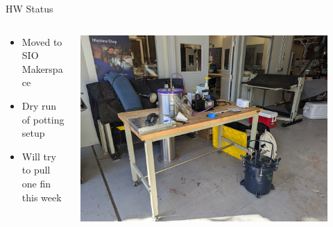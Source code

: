 \begin{frame}{HW Status}
    \begin{columns}
        \begin{column}{0.5\textwidth}
            \begin{itemize}
                \item Moved to SIO Makerspace
                \item Dry run of potting setup
                \item Will try to pull one fin this week
            \end{itemize}
        \end{column}
        \begin{column}{0.5\textwidth}
            \includegraphics[width=0.9\textwidth,height=0.9\textheight,keepaspectratio]{images/sf_potting_setup.jpg}
        \end{column}
    \end{columns}
\end{frame}



